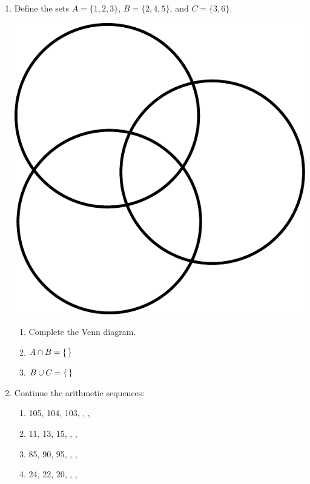 \documentclass{tufte-book}
\begin{document}
\begin{enumerate}
  \item Define the sets
  $A = \{1, 2, 3\}$,
  $B = \{2, 4, 5\}$, and
  $C = \{3, 6\}$.
  \begin{marginfigure}
  \includegraphics[width=\textwidth]{maths/fig/venn_blank_3.pdf}
  \end{marginfigure}
  \begin{enumerate}
    \item Complete the Venn diagram.\bigskip
    \item $A \cap B = \large\{$\dotfill$\large\}$\bigskip
    \item $B \cup C = \large\{$\dotfill$\large\}$
  \end{enumerate}

  \item Continue the arithmetic sequences:
  \begin{enumerate}\bigskip
    \item 105, 104, 103, \dotfill, \dotfill, \dotfill\bigskip
    \item 11, 13, 15, \dotfill, \dotfill, \dotfill\bigskip
    \item 85, 90, 95, \dotfill, \dotfill, \dotfill\bigskip
    \item 24, 22, 20, \dotfill, \dotfill, \dotfill
  \end{enumerate}
\end{enumerate}
\end{document}
